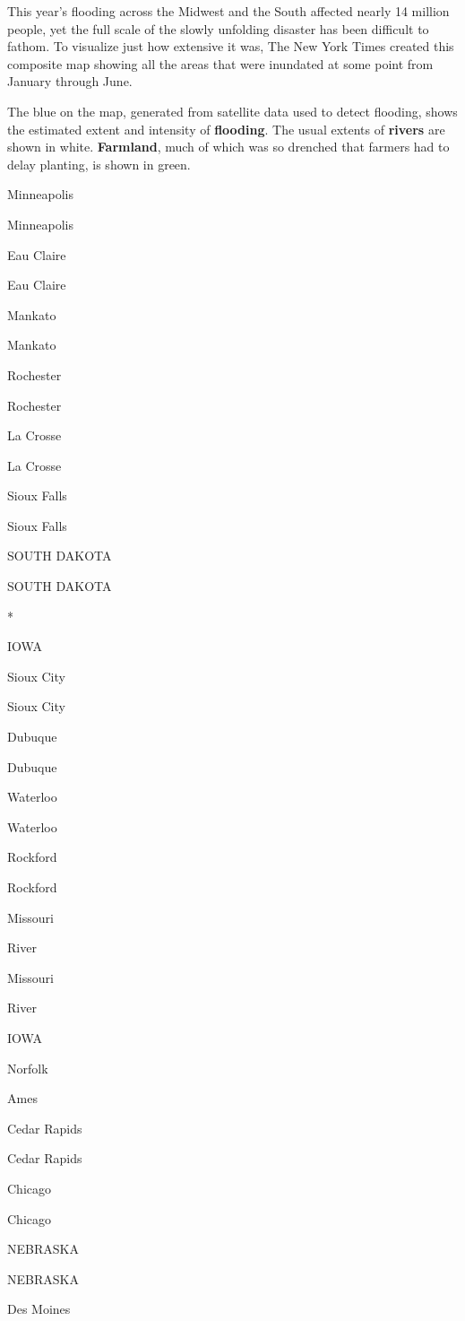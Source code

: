 This year's flooding across the Midwest and the South affected nearly 14
million people, yet the full scale of the slowly unfolding disaster has
been difficult to fathom. To visualize just how extensive it was, The
New York Times created this composite map showing all the areas that
were inundated at some point from January through June.

The blue on the map, generated from satellite data used to detect
flooding, shows the estimated extent and intensity of \textbf{flooding}.
The usual extents of \textbf{rivers} are shown in white.
\textbf{Farmland}, much of which was so drenched that farmers had to
delay planting, is shown in green.

Minneapolis

Minneapolis

Eau Claire

Eau Claire

Mankato

Mankato

Rochester

Rochester

La Crosse

La Crosse

Sioux Falls

Sioux Falls

SOUTH DAKOTA

SOUTH DAKOTA

*

IOWA

Sioux City

Sioux City

Dubuque

Dubuque

Waterloo

Waterloo

Rockford

Rockford

Missouri

River

Missouri

River

IOWA

Norfolk

Ames

Cedar Rapids

Cedar Rapids

Chicago

Chicago

NEBRASKA

NEBRASKA

Des Moines

